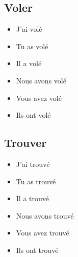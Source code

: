 \subsection{Voler}

\begin{itemize}
    \item J'ai volé
    \item Tu as volé 
    \item Il a volé 
    \item Nous avons volé 
    \item Vous avez volé 
    \item Ils ont volé 
\end{itemize}

\subsection{Trouver}

\begin{itemize}
    \item J'ai trouvé 
    \item Tu as trouvé 
    \item Il a trouvé 
    \item Nous avons trouvé 
    \item Vous avez trouvé 
    \item Ils ont trouvé
\end{itemize}